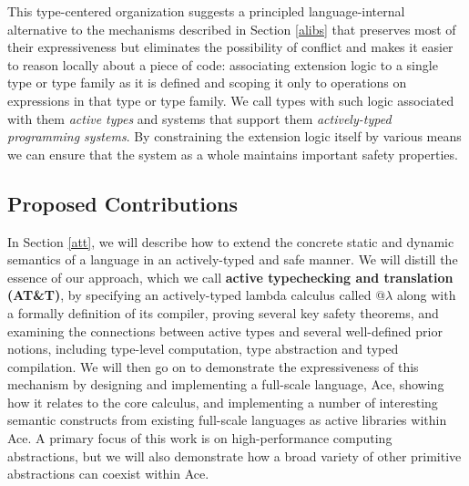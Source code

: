 This type-centered organization suggests a principled language-internal alternative to the mechanisms described in Section \ref{alibs} that preserves most of their expressiveness but eliminates the possibility of conflict and makes it easier to reason locally about a piece of code: associating extension logic to a single type or type family as it is defined and scoping it only to operations on expressions in that type or type family.  We call types with such logic associated with them \emph{active types} and systems that support them \emph{actively-typed programming systems}. By constraining the extension logic itself by various means we can ensure that the system as a whole maintains important safety properties.

\subsection{Proposed Contributions}
In Section \ref{att}, we will describe how to extend the concrete static and dynamic semantics of a language in an actively-typed and safe manner. We will distill the essence of our approach, which we call \textbf{active typechecking and translation (AT\&T)}, by specifying an actively-typed lambda calculus called @$\lambda$ along with a formally definition of its compiler, proving several key safety theorems, and examining the connections between active types and several well-defined prior notions, including type-level computation, type abstraction and typed compilation. We will then go on to demonstrate the expressiveness of this mechanism by designing and implementing a full-scale language, Ace, showing how it relates to the core calculus, and implementing a number of interesting semantic constructs from existing full-scale languages as active libraries within Ace. A primary focus of this work is on high-performance computing abstractions, but we will also demonstrate how a broad variety of other primitive abstractions can coexist within Ace.

